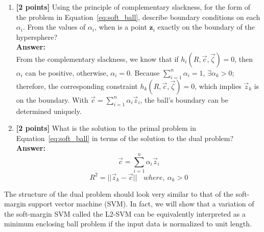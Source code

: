 \documentclass{article}
\begin{document}
\begin{enumerate}[resume]
\item \textbf{[2 points]} Using the principle of complementary slackness, for the form of the problem in Equation~\ref{eq:soft_ball}, describe boundary conditions on each $\alpha_i$. From the values of $\alpha_i$, when is a point $\boldsymbol{z}_i$ exactly on the boundary of the hypersphere?\\
\textbf{Answer:}\\

From the complementary slackness, we know that if $h_i(R,\vec{c},\vec{\zeta})=0$, then $\alpha_i$ can be positive, otherwise, $\alpha_i=0$. Because $\sum_{i=1}^n\alpha_i=1$, $\exists \alpha_k>0$; therefore, the corresponding constraint $h_k(R,\vec{c},\vec{\zeta})=0$, which implies $\vec{z}_k$ is on the boundary. With $\vec{c}=\sum_{i=1}^n\alpha_i\vec{z}_i$, the ball's boundary can be determined uniquely.

\item \textbf{[2 points]} What is the solution to the primal problem in Equation~\ref{eq:soft_ball} in terms of the solution to the dual problem?\\
\textbf{Answer:}\\
$$\vec{c}=\sum_{i=1}^n\alpha_i\vec{z}_i$$
$$R^2=||\vec{z}_k-\vec{c}||~~~~where,~\alpha_k>0$$



\end{enumerate}

The structure of the dual problem should look very similar to that of the soft-margin support vector 
machine (SVM). In fact, we will show that a variation of the soft-margin SVM called the L2-SVM can be equivalently interpreted 
as a minimum enclosing ball problem if the input data is normalized to unit length.
\end{document}
